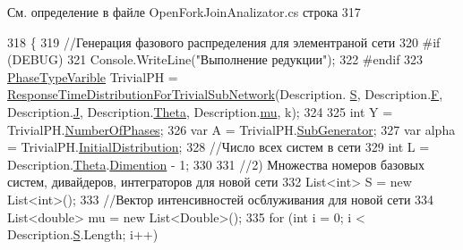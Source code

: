 См. определение в файле Open\+Fork\+Join\+Analizator.\+cs строка 317


\begin{DoxyCode}
318         \{
319             \textcolor{comment}{//Генерация фазового распределения для элементраной сети}
320 \textcolor{preprocessor}{#if (DEBUG)
}
321             Console.WriteLine(\textcolor{stringliteral}{"Выполнение редукции"});
322 \textcolor{preprocessor}{#endif
}
323             \hyperlink{class_phase_type_distribution_1_1_phase_type_varible}{PhaseTypeVarible} TrivialPH = 
      \hyperlink{class_exact_network_analysis_1_1_infinity_server_open_fork_join_analizator_afbb9c04d80ac7e389fae8476862c99e3}{ResponseTimeDistributionForTrivialSubNetwork}(Description.
      \hyperlink{class_network_descriptions_1_1_description_o_f_j_q_n_a31744a17bac05c3e10a7e958ad3fdb0c}{S}, Description.\hyperlink{class_network_descriptions_1_1_description_o_f_j_q_n_aaadbe1cc3f0bdb0bef593d2b732c988f}{F}, Description.\hyperlink{class_network_descriptions_1_1_description_o_f_j_q_n_a75cf16b40e07c708c6580d331e692de0}{J}, Description.\hyperlink{class_network_descriptions_1_1_description_o_f_j_q_n_af8d4bf8f19a4db2daef14d0dafd77a00}{Theta}, Description.\hyperlink{class_network_descriptions_1_1_description_o_f_j_q_n_a378792ff9db7825dfeee852298fd3314}{mu}, k);
324 
325             \textcolor{keywordtype}{int} Y = TrivialPH.\hyperlink{class_phase_type_distribution_1_1_phase_type_varible_a1bfaf7709c227b28fbbc89b808a89bfe}{NumberOfPhases};
326             var A = TrivialPH.\hyperlink{class_phase_type_distribution_1_1_phase_type_varible_a9832e75be88711d5939e808aea3b4121}{SubGenerator};
327             var alpha = TrivialPH.\hyperlink{class_phase_type_distribution_1_1_phase_type_varible_ac9102d397b010f61b97cda69acfdb31b}{InitialDistribution};
328             \textcolor{comment}{//Число всех систем в сети}
329             \textcolor{keywordtype}{int} L = Description.\hyperlink{class_network_descriptions_1_1_description_o_f_j_q_n_af8d4bf8f19a4db2daef14d0dafd77a00}{Theta}.\hyperlink{class_network_descriptions_1_1_routing_matrix_a417bebac18f3b241d4e40d55d9b44213}{Dimention} - 1;
330 
331             \textcolor{comment}{//2) Множества номеров базовых систем, дивайдеров, интеграторов для новой сети}
332             List<int> S = \textcolor{keyword}{new} List<int>();
333             \textcolor{comment}{//Вектор интенсивностей осблуживания для новой сети}
334             List<double> mu = \textcolor{keyword}{new} List<Double>();
335             \textcolor{keywordflow}{for} (\textcolor{keywordtype}{int} i = 0; i < Description.\hyperlink{class_network_descriptions_1_1_description_o_f_j_q_n_a31744a17bac05c3e10a7e958ad3fdb0c}{S}.Length; i++)

\end{DoxyCode}
